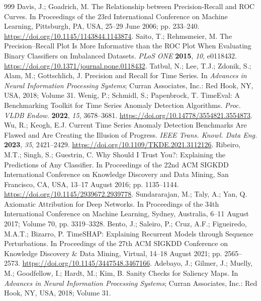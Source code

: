 \documentclass[drones,article,submit,moreauthors]{Definitions/mdpi}
\begin{document}
\begin{thebibliography}{999}
 Davis, J.; Goadrich, M. The Relationship between Precision-Recall and ROC Curves. In Proceedings of the 23rd International Conference on Machine Learning, Pittsburgh, PA, USA, 25--29 June 2006; pp. 233--240. \href{https://doi.org/10.1145/1143844.1143874}{https://doi.org/10.1145/1143844.1143874}.
 Saito, T.; Rehmsmeier, M. The Precision--Recall Plot Is More Informative than the ROC Plot When Evaluating Binary Classifiers on Imbalanced Datasets. \textit{PLoS ONE} \textbf{2015}, \textit{10}, e0118432. \href{https://doi.org/10.1371/journal.pone.0118432}{https://doi.org/10.1371/journal.pone.0118432}.
 Tatbul, N.; Lee, T.J.; Zdonik, S.; Alam, M.; Gottschlich, J. Precision and Recall for Time Series. In \textit{Advances in Neural Information Processing Systems}; Curran Associates, Inc.: Red Hook, NY, USA, 2018; Volume 31.
 Wenig, P.; Schmidl, S.; Papenbrock, T. TimeEval: A Benchmarking Toolkit for Time Series Anomaly Detection Algorithms. \textit{Proc. VLDB Endow.} \textbf{2022}, \textit{15}, 3678--3681. \href{https://doi.org/10.14778/3554821.3554873}{https://doi.org/10.14778/3554821.3554873}.
 Wu, R.; Keogh, E.J. Current Time Series Anomaly Detection Benchmarks Are Flawed and Are Creating the Illusion of Progress. \textit{IEEE Trans. Knowl. Data Eng.} \textbf{2023}, \textit{35}, 2421--2429. \href{https://doi.org/10.1109/TKDE.2021.3112126}{https://doi.org/10.1109/TKDE.2021.3112126}.
 Ribeiro, M.T.; Singh, S.; Guestrin, C. Why Should I Trust You?: Explaining the Predictions of Any Classifier. In Proceedings of the 22nd ACM SIGKDD International Conference on Knowledge Discovery and Data Mining, San Francisco, CA, USA, 13--17 August 2016; pp. 1135--1144. \href{https://doi.org/10.1145/2939672.2939778}{https://doi.org/10.1145/2939672.2939778}.
 Sundararajan, M.; Taly, A.; Yan, Q. Axiomatic Attribution for Deep Networks. In Proceedings of the 34th International Conference on Machine Learning, Sydney, Australia, 6--11 August 2017; Volume 70, pp. 3319--3328.
 Bento, J.; Saleiro, P.; Cruz, A.F.; Figueiredo, M.A.T.; Bizarro, P. TimeSHAP: Explaining Recurrent Models through Sequence Perturbations. In Proceedings of the 27th ACM SIGKDD Conference on Knowledge Discovery \& Data Mining, Virtual, 14--18 August 2021; pp. 2565--2573. \href{https://doi.org/10.1145/3447548.3467166}{https://doi.org/10.1145/3447548.3467166}.
 Adebayo, J.; Gilmer, J.; Muelly, M.; Goodfellow, I.; Hardt, M.; Kim, B. Sanity Checks for Saliency Maps. In \textit{Advances in Neural Information Processing Systems}; Curran Associates, Inc.: Red Hook, NY, USA, 2018; Volume 31.

\end{thebibliography}
\end{document}
